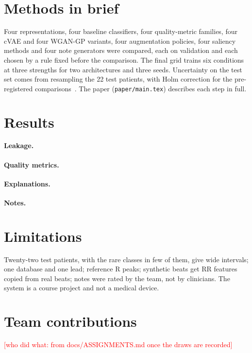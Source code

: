 \documentclass[11pt]{article}
\newcommand{\missing}[1]{\textcolor{red}{[#1]}}
\begin{document}
\section{Methods in brief}
Four representations, four baseline classifiers, four quality-metric families, four cVAE and four WGAN-GP variants,
four augmentation policies, four saliency methods and four note generators were compared, each on validation and each
chosen by a rule fixed before the comparison. The final grid trains six conditions at three strengths for two
architectures and three seeds. Uncertainty on the test set comes from resampling the 22 test patients, with Holm
correction for the pre-registered comparisons~\cite{holm1979}. The paper (\texttt{paper/main.tex}) describes each
step in full.

\section{Results}
\begin{table}[htbp]\centering\small{}\caption{Pre-registered hypotheses and their verdicts.}\end{table}

\begin{table}[htbp]\centering\small{}\caption{Test results per condition (95\% record-level CI).}\end{table}
\paragraph{Leakage.} 
\paragraph{Quality metrics.} 
\paragraph{Explanations.} 
\paragraph{Notes.} 

\section{Limitations}
Twenty-two test patients, with the rare classes in few of them, give wide intervals; one database and one lead;
reference R peaks; synthetic beats get RR features copied from real beats; notes were rated by the team, not by
clinicians. The system is a course project and not a medical device.

\section{Team contributions}
\missing{who did what: from docs/ASSIGNMENTS.md once the draws are recorded}



\end{document}
